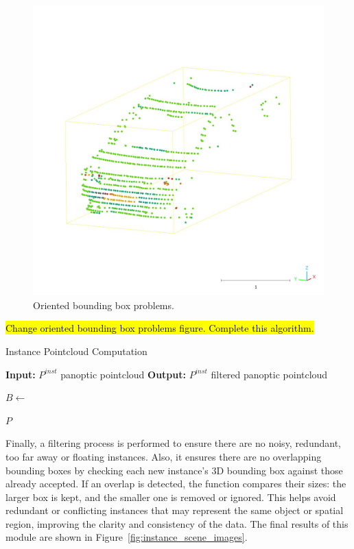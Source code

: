 \begin{figure}[h!]
    \centering
    \includegraphics[width=0.5\linewidth]{images/methodology/oriendet_bbox_problem_aux.jpeg}
    \caption{Oriented bounding box problems.}
    \label{fig:oriented_bounding_box_problems}
\end{figure}

\hl{Change oriented bounding box problems figure. Complete this algorithm.}
\begin{algorithm}
    \caption{Instance Pointcloud Computation}
    \label{algorithm:instance_pointcloud}
    \footnotesize

    \begin{algorithmic}[1]
        \State \textbf{Input:} $P^{inst}$ panoptic pointcloud
        \State \textbf{Output:} $P^{inst}$ filtered panoptic pointcloud
        
                \State $B \gets $
            
            \EndFor
        \EndFor
        
        \State \Return $P$
    \end{algorithmic}
\end{algorithm}

Finally, a filtering process is performed to ensure there are no noisy, redundant, too far away or floating instances. Also, it ensures there are no overlapping bounding boxes by checking each new instance's 3D bounding box against those already accepted. If an overlap is detected, the function compares their sizes: the larger box is kept, and the smaller one is removed or ignored. This helps avoid redundant or conflicting instances that may represent the same object or spatial region, improving the clarity and consistency of the data. The final results of this module are shown in Figure~\ref{fig:instance_scene_images}.

